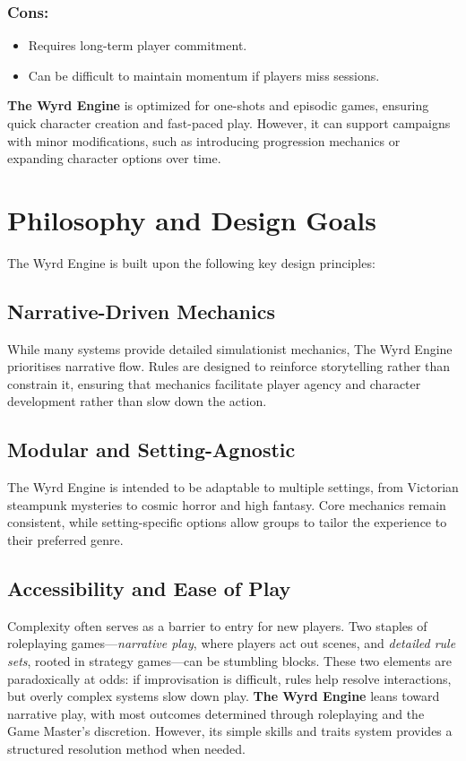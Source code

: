\subsubsection{Cons:}
\begin{itemize}
    \item Requires long-term player commitment.
    \item Can be difficult to maintain momentum if players miss sessions.
\end{itemize}

\textbf{The Wyrd Engine} is optimized for one-shots and episodic games, ensuring quick character creation and fast-paced play. However, it can support campaigns with minor modifications, such as introducing progression mechanics or expanding character options over time.

\section{Philosophy and Design Goals}
The Wyrd Engine is built upon the following key design principles:

\subsection{Narrative-Driven Mechanics}
While many systems provide detailed simulationist mechanics, The Wyrd Engine prioritises narrative flow. Rules are designed to reinforce storytelling rather than constrain it, ensuring that mechanics facilitate player agency and character development rather than slow down the action.

\subsection{Modular and Setting-Agnostic}
The Wyrd Engine is intended to be adaptable to multiple settings, from Victorian steampunk mysteries to cosmic horror and high fantasy. Core mechanics remain consistent, while setting-specific options allow groups to tailor the experience to their preferred genre.

\subsection{Accessibility and Ease of Play}
Complexity often serves as a barrier to entry for new players. Two staples of roleplaying games—\emph{narrative play}, where players act out scenes, and \emph{detailed rule sets}, rooted in strategy games—can be stumbling blocks. These two elements are paradoxically at odds: if improvisation is difficult, rules help resolve interactions, but overly complex systems slow down play. \textbf{The Wyrd Engine} leans toward narrative play, with most outcomes determined through roleplaying and the Game Master's discretion. However, its simple skills and traits system provides a structured resolution method when needed.

